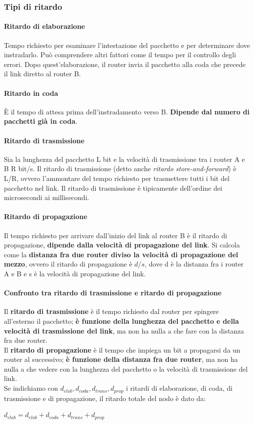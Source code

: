 \documentclass[11pt,a4paper]{article}
\begin{document}
\subsubsection{Tipi di ritardo}
\paragraph{Ritardo di elaborazione}
Tempo richiesto per esaminare l’intestazione del pacchetto e per determinare dove instradarlo.
Può comprendere altri fattori come il tempo per il controllo degli errori.
Dopo quest’elaborazione, il router invia il pacchetto alla coda che precede il link diretto al router B.
\paragraph{Ritardo in coda}
È il tempo di attesa prima dell’instradamento verso B. \textbf{Dipende dal numero di pacchetti già in coda}.
\paragraph{Ritardo di trasmissione}
Sia la lunghezza del pacchetto L bit e la velocità di trasmissione tra i router A e B R bit/s. Il ritardo di trasmissione (detto anche \emph{ritardo store-and-forward}) è L/R, ovvero l'ammontare del tempo richiesto per trasmettere tutti i bit del pacchetto nel link.
Il ritardo di trasmissione è tipicamente dell'ordine dei microsecondi ai millisecondi.
\paragraph{Ritardo di propagazione}
Il tempo richiesto per arrivare dall'inizio del link al router B è il ritardo di propagazione, \textbf{dipende dalla velocità di propagazione del link}.
Si calcola come la \textbf{distanza fra due router diviso la velocità di propagazione del mezzo}, ovvero il ritardo di propagazione è $d/s$, dove d è la distanza fra i router A e B e s è la velocità di propagazione del link.
\paragraph{Confronto tra ritardo di trasmissione e ritardo di propagazione}
Il \textbf{ritardo di trasmissione} è il tempo richiesto dal router per spingere all'esterno il pacchetto; \textbf{è funzione della lunghezza del pacchetto e della velocità di trasmissione del link}, ma non ha nulla a che fare con la distanza fra due router.\\
Il \textbf{ritardo di propagazione} è il tempo che impiega un bit a propagarsi da un router al successivo; \textbf{è funzione della distanza fra due router}, ma non ha nulla a che vedere con la lunghezza del pacchetto o la velocità di trasmissione del link. \\
Se indichiamo con $d_{elab}, d_{coda}, d_{trans}, d_{prop}$ i ritardi di elaborazione, di coda, di trasmissione e di propagazione, il ritardo totale del nodo è dato da:
\begin{center}
	$d_{elab} = d_{elab} + d_{coda} + d_{trans} + d_{prop}$
\end{center}
\end{document}
